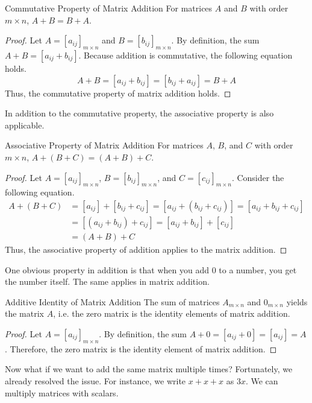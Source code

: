\documentclass[../../main.tex]{subfiles}
\begin{document}
\begin{theorem}{}{Commutative Property of Matrix Addition}
For matrices $A$ and $B$ with order $m \times n$, $A + B = B + A$.
\end{theorem}
\begin{proof}
Let $A = [a_{ij}]_{m \times n}$ and $B = [b_{ij}]_{m \times n}$.
By definition, the sum $A + B = [a_{ij} + b_{ij}]$. Because
addition is commutative, the following equation holds.
\[
A + B
= [a_{ij} + b_{ij}]
= [b_{ij} + a_{ij}]
= B + A
\]
Thus, the commutative property of matrix addition holds.
\end{proof}

In addition to the commutative property, the associative property
is also applicable.

\begin{theorem}{}{Associative Property of Matrix Addition}
For matrices $A$, $B$, and $C$ with order $m \times n$,
$A + (B + C) = (A + B) + C$.
\end{theorem}
\begin{proof}
Let $A = [a_{ij}]_{m \times n}$, $B = [b_{ij}]_{m \times n}$,
and $C = [c_{ij}]_{m \times n}$. Consider the following equation.
\begin{align*}
    A + (B + C)
    &= [a_{ij}] + [b_{ij} + c_{ij}]
     = [a_{ij} + (b_{ij} + c_{ij})]
     = [a_{ij} + b_{ij} + c_{ij}] \\
    &= [(a_{ij} + b_{ij}) + c_{ij}]
     = [a_{ij} + b_{ij}] + [c_{ij}] \\
    &= (A + B) + C
\end{align*}
Thus, the associative property of addition applies to the matrix
addition.
\end{proof}

One obvious property in addition is that when you add $0$ to a number,
you get the number itself. The same applies in matrix addition.

\begin{theorem}{}{Additive Identity of Matrix Addition}
The sum of matrices $A_{m \times n}$ and $0_{m \times n}$ yields
the matrix $A$, i.e. the zero matrix is the identity elements of
matrix addition.
\end{theorem}
\begin{proof}
Let $A = [a_{ij}]_{m \times n}$. By definition, the sum $A + 0
= [a_{ij} + 0] = [a_{ij}] = A$. Therefore, the zero matrix is the
identity element of matrix addition.
\end{proof}

Now what if we want to add the same matrix multiple times?
Fortunately, we already resolved the issue. For instance,
we write $x + x + x$ as $3x$. We can multiply matrices with scalars.
\end{document}
